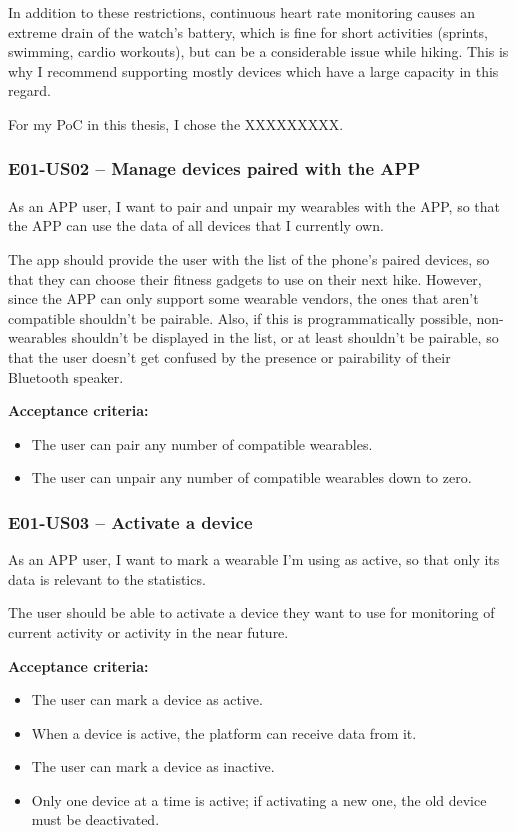 In addition to these restrictions, continuous heart rate monitoring causes an extreme drain of the watch's battery, which is fine for short activities (sprints, swimming, cardio workouts), but can be a considerable issue while hiking.
This is why I recommend supporting mostly devices which have a large capacity in this regard.

For my PoC in this thesis, I chose the XXXXXXXXX.

\subsubsection*{E01-US02 -- Manage devices paired with the APP}
As an APP user, I want to pair and unpair my wearables with the APP, so that the APP can use the data of all devices that I currently own.

The app should provide the user with the list of the phone's paired devices, so that they can choose their fitness gadgets to use on their next hike.
However, since the APP can only support some wearable vendors, the ones that aren't compatible shouldn't be pairable.
Also, if this is programmatically possible, non-wearables shouldn't be displayed in the list, or at least shouldn't be pairable,
so that the user doesn't get confused by the presence or pairability of their Bluetooth speaker.

\textbf{Acceptance criteria:}
\begin{itemize}
    \item The user can pair any number of compatible wearables.
    \item The user can unpair any number of compatible wearables down to zero.
\end{itemize}

\subsubsection*{E01-US03 -- Activate a device}
As an APP user, I want to mark a wearable I'm using as active, so that only its data is relevant to the statistics.

The user should be able to activate a device they want to use for monitoring of current activity or activity in the near future.

\textbf{Acceptance criteria:}
\begin{itemize}
    \item The user can mark a device as active.
    \item When a device is active, the platform can receive data from it.
    \item The user can mark a device as inactive.
    \item Only one device at a time is active; if activating a new one, the old device must be deactivated.
\end{itemize}    

